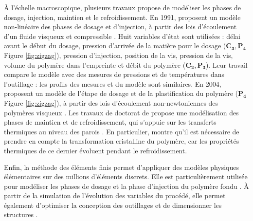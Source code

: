 À l'échelle macroscopique, plusieurs travaux propose de modéliser les phases de dosage, injection, maintien et le refroidissement.
En 1991, \citeauthor{chiu_dynamic_1991} proposent un modèle non-linéaire des phases de dosage et d'injection, à partir des lois d'écoulement d'un fluide visqueux et compressible \cite{chiu_dynamic_1991}.
Huit variables d’état sont utilisées : délai avant le début du dosage, pression d’arrivée de la matière pour le dosage ($\boldsymbol{C_3, P_4}$ Figure \ref{fig:zigzag}), pression d’injection, position de la vis, pression de la vis, volume du polymère dans l’empreinte et débit du polymère ($\boldsymbol{C_2, P_3}$).
Leur travail compare le modèle avec des mesures de pressions et de températures dans l'outillage : les profils des mesures et du modèle sont similaires.
En 2004, \citeauthor{bereaux_series_2004} proposent un modèle de l'étape de dosage et de la plastification du polymère ($\boldsymbol{P_4}$ Figure \ref{fig:zigzag}), à partir des lois d'écoulement non-newtoniennes des polymères visqueux \cite{bereaux_series_2004}.  %
Les travaux de doctorat de \citeauthor{legoff_etude_2006} propose une modélisation des phases de maintien et de refroidissement, qui s'appuie sur les transferts thermiques au niveau des parois \cite{legoff_study_2005, legoff_etude_2006}.
En particulier, \citeauthor{legoff_etude_2006} montre qu'il est nécessaire de prendre en compte la transformation cristalline du polymère, car les propriétés thermiques de ce dernier évoluent pendant le refroidissement.

Enfin, la méthode des éléments finis permet d'appliquer des modèles physiques élémentaires sur des millions d'éléments discrets.
Elle est particulièrement utilisée pour modéliser les phases de dosage et la phase d'injection du polymère fondu \cite{moguedet_use_2009}.
À partir de la simulation de l'évolution des variables du procédé, elle permet également d’optimiser la conception des outillages et de dimensionner les structures \cite{gao_adaptive_2008}.

